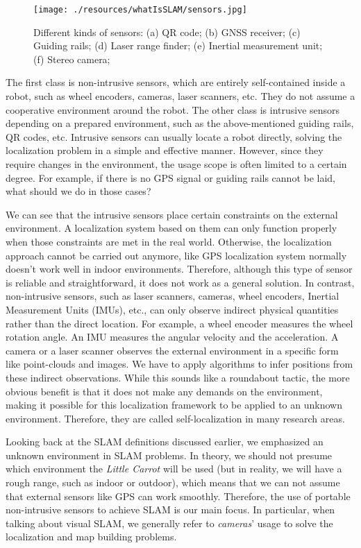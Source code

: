 \begin{figure}
	\centering
	\texttt{[image: ./resources/whatIsSLAM/sensors.jpg]}
	\caption{Different kinds of sensors: (a) QR code; (b) GNSS receiver; (c) Guiding rails; (d) Laser range finder; (e) Inertial measurement unit; (f) Stereo camera; }
	\label{fig:sensors}
\end{figure}

The first class is non-intrusive sensors, which are entirely self-contained inside a robot, such as wheel encoders, cameras, laser scanners, etc. They do not assume a cooperative environment around the robot. The other class is intrusive sensors depending on a prepared environment, such as the above-mentioned guiding rails, QR codes, etc. Intrusive sensors can usually locate a robot directly, solving the localization problem in a simple and effective manner. However, since they require changes in the environment, the usage scope is often limited to a certain degree. For example, if there is no GPS signal or guiding rails cannot be laid, what should we do in those cases?

We can see that the intrusive sensors place certain constraints on the external environment. A localization system based on them can only function properly when those constraints are met in the real world. Otherwise, the localization approach cannot be carried out anymore, like GPS localization system normally doesn't work well in indoor environments. Therefore, although this type of sensor is reliable and straightforward, it does not work as a general solution. In contrast, non-intrusive sensors, such as laser scanners, cameras, wheel encoders, Inertial Measurement Units (IMUs), etc., can only observe indirect physical quantities rather than the direct location. For example, a wheel encoder measures the wheel rotation angle. An IMU measures the angular velocity and the acceleration. A camera or a laser scanner observes the external environment in a specific form like point-clouds and images. We have to apply algorithms to infer positions from these indirect observations. While this sounds like a roundabout tactic, the more obvious benefit is that it does not make any demands on the environment, making it possible for this localization framework to be applied to an unknown environment. Therefore, they are called self-localization in many research areas.

Looking back at the SLAM definitions discussed earlier, we emphasized an unknown environment in SLAM problems. In theory, we should not presume which environment the \textit{Little Carrot} will be used (but in reality, we will have a rough range, such as indoor or outdoor), which means that we can not assume that external sensors like GPS can work smoothly. Therefore, the use of portable non-intrusive sensors to achieve SLAM is our main focus. In particular, when talking about visual SLAM, we generally refer to \textit{cameras}' usage to solve the localization and map building problems.

